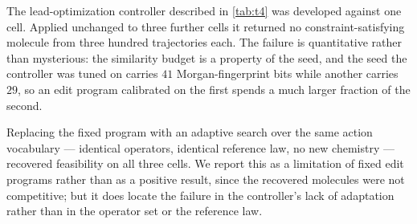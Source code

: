 \documentclass{article}
\theoremstyle{definition}
\theoremstyle{remark}
\begin{document}
The lead-optimization controller described in \cref{tab:t4} was developed
against one cell. Applied unchanged to three further cells it returned no
constraint-satisfying molecule from three hundred trajectories each. The
failure is quantitative rather than mysterious: the similarity budget is a
property of the seed, and the seed the controller was tuned on carries $41$
Morgan-fingerprint bits while another carries $29$, so an edit program
calibrated on the first spends a much larger fraction of the second.

Replacing the fixed program with an adaptive search over the same action
vocabulary --- identical operators, identical reference law, no new chemistry
--- recovered feasibility on all three cells. We report this as a limitation of
fixed edit programs rather than as a positive result, since the recovered
molecules were not competitive; but it does locate the failure in the
controller's lack of adaptation rather than in the operator set or the
reference law.
\end{document}
